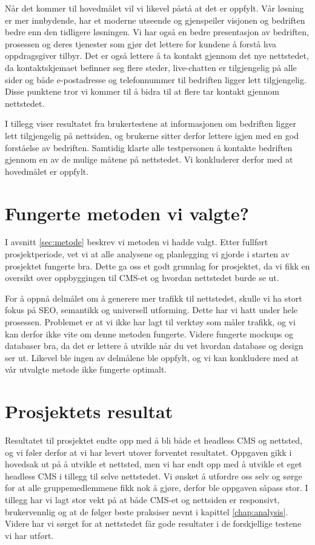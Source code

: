 Når det kommer til hovedmålet vil vi likevel påstå at det er oppfylt. Vår løsning er mer innbydende, har et moderne utseende og gjenspeiler visjonen og bedriften bedre enn den tidligere løsningen. Vi har også en bedre presentasjon av bedriften, prosessen og deres tjenester som gjør det lettere for kundene å forstå hva oppdragsgiver tilbyr. Det er også lettere å ta kontakt gjennom det nye nettstedet, da kontaktskjemaet befinner seg flere steder, live-chatten er tilgjengelig på alle sider og både e-postadresse og telefonnummer til bedriften ligger lett tilgjengelig. Disse punktene tror vi kommer til å bidra til at flere tar kontakt gjennom nettstedet. 

I tillegg viser resultatet fra brukertestene at informasjonen om bedriften ligger lett tilgjengelig på nettsiden, og brukerne sitter derfor lettere igjen med en god forståelse av bedriften. Samtidig klarte alle testpersonen å kontakte bedriften gjennom en av de mulige måtene på nettstedet. Vi konkluderer derfor med at hovedmålet er oppfylt. 


\section{Fungerte metoden vi valgte?}
I avsnitt \ref{sec:metode} beskrev vi metoden vi hadde valgt. Etter fullført prosjektperiode, vet vi at alle analysene og planlegging vi gjorde i starten av prosjektet fungerte bra. Dette ga oss et godt grunnlag for prosjektet, da vi fikk en oversikt over oppbyggingen til CMS-et og hvordan nettstedet burde se ut. 

For å oppnå delmålet om å generere mer trafikk til nettstedet, skulle vi ha stort fokus på SEO, semantikk og universell utforming. Dette har vi hatt under hele prosessen. Problemet er at vi ikke har lagt til verktøy som måler trafikk, og vi kan derfor ikke vite om denne metoden fungerte. Videre fungerte mockups og databaser bra, da det er lettere å utvikle når du vet hvordan database og design ser ut. Likevel ble ingen av delmålene ble oppfylt, og vi kan konkludere med at vår utvalgte metode ikke fungerte optimalt.

\section{Prosjektets resultat}
Resultatet til prosjektet endte opp med å bli både et headless CMS og nettsted, og vi føler derfor at vi har levert utover forventet resultatet. Oppgaven gikk i hovedsak ut på å utvikle et nettsted, men vi har endt opp med å utvikle et eget headless CMS i tillegg til selve nettstedet. Vi ønsket å utfordre oss selv og sørge for at alle gruppemedlemmene fikk nok å gjøre, derfor ble oppgaven såpass stor. I tillegg har vi lagt stor vekt på at både CMS-et og nettsiden er responsivt, brukervennlig og at de følger beste praksiser nevnt i kapittel \ref{chap:analysis}. Videre har vi sørget for at nettstedet får gode resultater i de forskjellige testene vi har utført.

